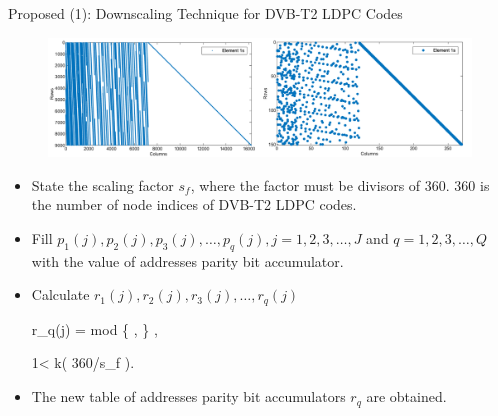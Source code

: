 \documentclass[11pt, aspectratio=169]{beamer}
\begin{document}
\begin{frame}{Proposed (1): Downscaling Technique for DVB-T2 LDPC Codes }
\begin{figure}
\centering 
\includegraphics[scale=0.35]{gambarafa/compareH}

\label{sistemmodelMQCLDPC} %
\end{figure}
%

\begin{itemize}
	
	\item State the scaling factor $s_f$, where the factor must be divisors of $360$.  $360$ is the number of node indices of DVB-T2 LDPC codes.
	\item Fill $p_{1}(j), p_{2}(j), p_{3}(j), \dots, p_{q}(j), j= 1, 2, 3, \dots, J$  and $q= 1, 2, 3, \dots, Q$ with the value of addresses parity bit accumulator. 
	\item Calculate $r_{1}(j), r_{2}(j), r_{3}(j), \dots, r_{q}(j)$ \begin{flalign}
	r_{q}(j) = mod \{ , \nonumber  \left [ P/s_f \right ] \} , 
	\end{flalign}
	\begin{flalign}
	1< k\leq \left ( 360/s_f \right ).
	\end{flalign}
	
	
	\item The new table of addresses parity bit accumulators $r_q$ are obtained.
	
\end{itemize}




\end{frame}
\end{document}
